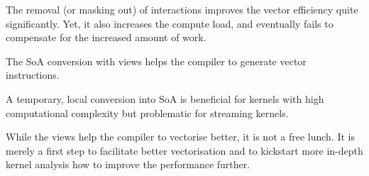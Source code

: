 The removal (or masking out) of interactions improves the vector efficiency quite significantly.
Yet, it also increases the compute load, and eventually fails to compensate for the increased amount of work. 


\begin{observation}
 The SoA conversion with views helps the compiler to generate vector instructions. 
\end{observation}

\begin{observation}
 A temporary, local conversion into SoA is beneficial for kernels with high computational complexity but problematic for streaming kernels. 
\end{observation}

%
%
\noindent
While the views help the compiler to vectorise better, it is not a free lunch.
It is merely a first step to facilitate better vectorisation and to kickstart more in-depth kernel analysis how to improve the performance further. 
